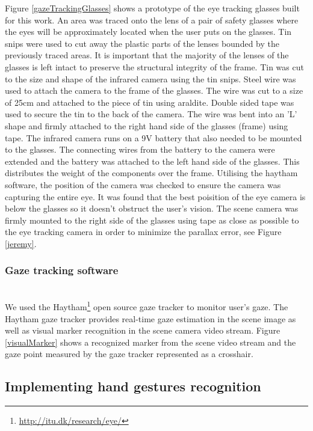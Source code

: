 \documentclass[jou,a4paper,notxfonts]{apa}
\begin{document}
Figure \ref{gazeTrackingGlasses} shows a prototype of the eye tracking glasses built for this work. An area was traced onto the lens of a pair of safety glasses where the eyes will be approximately located when the user puts on the glasses. Tin snips were used to cut away the plastic parts of the lenses bounded by the previously traced areas. It is important that the majority of the lenses of the glasses is left intact to preserve the structural integrity of the frame. Tin was cut to the size and shape of the infrared camera using the tin snips. Steel wire was used to attach the camera to the frame of the glasses. The wire was cut to a size of 25cm and attached to the piece of tin using araldite. Double sided tape was used to secure the tin to the back of the camera. The wire was bent into an 'L' shape and firmly attached to the right hand side of the glasses (frame) using tape. The infrared camera runs on a 9V battery that also needed to be mounted to the glasses. The connecting wires from the battery to the camera were extended and the battery was attached to the left hand side of the glasses. This distributes the weight of the components over the frame. Utilising the haytham software, the position of the camera was checked to ensure the camera was capturing the entire eye. It was found that the best poisition of the eye camera is below the glasses so it doesn't obstruct the user's vision. The scene camera was firmly mounted to the right side of the glasses using tape as close as possible to the eye tracking camera in order to minimize the parallax error, see Figure \ref{jeremy}.

\subsubsection{Gaze tracking software}\hspace{0pt} \\
We used the Haytham\footnote{\url{http://itu.dk/research/eye/}} open source gaze tracker to monitor user's gaze. The Haytham gaze tracker provides real-time gaze estimation in the scene image as well as visual marker recognition in the scene camera video stream. Figure \ref{visualMarker} shows a recognized marker from the scene video stream and the gaze point measured by the gaze tracker represented as a crosshair. 

\subsection{Implementing hand gestures recognition}
\end{document}
